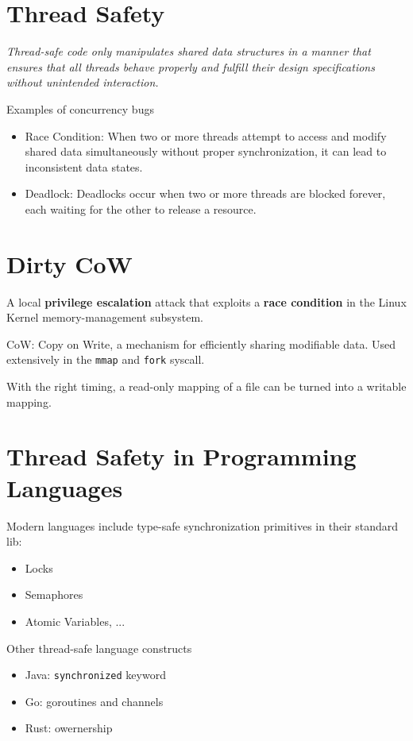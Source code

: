 \documentclass[11pt]{article}
\begin{document}
\vspace{0.5cm}

\section*{Thread Safety}

\textit{Thread-safe code only manipulates shared data structures in a manner that ensures that all threads behave properly and fulfill their design specifications without unintended interaction.}

Examples of concurrency bugs
\begin{itemize}
	\item Race Condition: When two or more threads attempt to access and modify shared data simultaneously without proper synchronization, it can lead to inconsistent data states.
	\item Deadlock: Deadlocks occur when two or more threads are blocked forever, each waiting for the other to release a resource.

\end{itemize}

\section*{Dirty CoW}

A local \textbf{privilege escalation} attack that exploits a \textbf{race condition} in the Linux Kernel memory-management subsystem.

CoW: Copy on Write, a mechanism for efficiently sharing modifiable data. Used extensively in the \verb|mmap| and \verb|fork| syscall.

With the right timing, a read-only mapping of a file can be turned into a writable mapping.

\section*{Thread Safety in Programming Languages}

Modern languages include type-safe synchronization primitives in their standard lib: 
\begin{itemize}
	\item Locks
	\item Semaphores
	\item Atomic Variables, ...
\end{itemize}

Other thread-safe language constructs
\begin{itemize}
	\item Java: \verb|synchronized| keyword
	\item Go: goroutines and channels
	\item Rust: owernership
\end{itemize}
\end{document}
